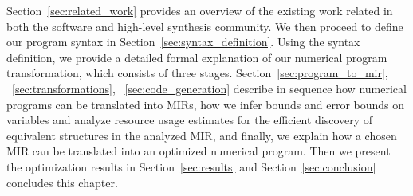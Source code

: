 Section~\ref{sec:related_work} provides an overview of the existing work
related in both the software and high-level synthesis community.  We then
proceed to define our program syntax in Section~\ref{sec:syntax_definition}.
Using the syntax definition, we provide a detailed formal explanation
of our numerical program transformation, which consists of three
stages.  Section~\ref{sec:program_to_mir}, {}~\ref{sec:transformations},
{}~\ref{sec:code_generation} describe in sequence how numerical programs
can be translated into MIRs, how we infer bounds and error bounds on
variables and analyze resource usage estimates for the efficient discovery
of equivalent structures in the analyzed MIR, and finally, we explain how
a chosen MIR can be translated into an optimized numerical program.  Then
we present the optimization results in Section~\ref{sec:results} and
Section~\ref{sec:conclusion} concludes this chapter.
